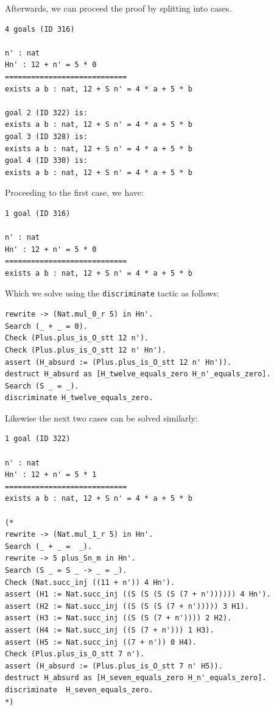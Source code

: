 \documentclass{article}
\begin{document}
Afterwards, we can proceed the proof by splitting into cases. 

\begin{lstlisting}
4 goals (ID 316)

n' : nat
Hn' : 12 + n' = 5 * 0
============================
exists a b : nat, 12 + S n' = 4 * a + 5 * b

goal 2 (ID 322) is:
exists a b : nat, 12 + S n' = 4 * a + 5 * b
goal 3 (ID 328) is:
exists a b : nat, 12 + S n' = 4 * a + 5 * b
goal 4 (ID 330) is:
exists a b : nat, 12 + S n' = 4 * a + 5 * b
\end{lstlisting}

Proceeding to the first case, we have:

\begin{lstlisting}
1 goal (ID 316)

n' : nat
Hn' : 12 + n' = 5 * 0
============================
exists a b : nat, 12 + S n' = 4 * a + 5 * b
\end{lstlisting}

Which we solve using the \texttt{discriminate} tactic as follows:

\begin{lstlisting}
rewrite -> (Nat.mul_0_r 5) in Hn'.
Search (_ + _ = 0).
Check (Plus.plus_is_O_stt 12 n').
Check (Plus.plus_is_O_stt 12 n' Hn').
assert (H_absurd := (Plus.plus_is_O_stt 12 n' Hn')).
destruct H_absurd as [H_twelve_equals_zero H_n'_equals_zero].
Search (S _ = _).
discriminate H_twelve_equals_zero.
\end{lstlisting}

Likewise the next two cases can be solved similarly:

\begin{lstlisting}
1 goal (ID 322)

n' : nat
Hn' : 12 + n' = 5 * 1
============================
exists a b : nat, 12 + S n' = 4 * a + 5 * b

(* 
rewrite -> (Nat.mul_1_r 5) in Hn'.
Search (_ + _ =  _).
rewrite -> 5 plus_Sn_m in Hn'.
Search (S _ = S _ -> _ = _).
Check (Nat.succ_inj ((11 + n')) 4 Hn').
assert (H1 := Nat.succ_inj ((S (S (S (S (7 + n')))))) 4 Hn').
assert (H2 := Nat.succ_inj ((S (S (S (7 + n'))))) 3 H1).
assert (H3 := Nat.succ_inj ((S (S (7 + n')))) 2 H2).
assert (H4 := Nat.succ_inj ((S (7 + n'))) 1 H3).
assert (H5 := Nat.succ_inj ((7 + n')) 0 H4).
Check (Plus.plus_is_O_stt 7 n').
assert (H_absurd := (Plus.plus_is_O_stt 7 n' H5)).
destruct H_absurd as [H_seven_equals_zero H_n'_equals_zero].
discriminate  H_seven_equals_zero.
*)
\end{lstlisting}
\end{document}
